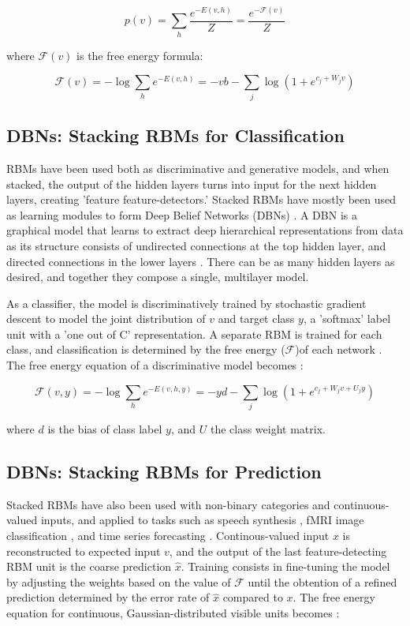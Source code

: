 \documentclass{report}
\begin{document}
\begin{equation}
p(v) =  \sum_h \frac{e^{-E(v,h)}}{Z} = \frac{e^{-\mathcal{F}(v)}}{Z}
\end{equation}

where $\mathcal{F}(v)$ is the free energy formula:

\begin{equation}
\mathcal{F}(v) = -\log \sum_h e^{-E(v,h)} = -vb - \sum_j \log (1 + e^{c_j + W_j v})
\label{eq:fev}
\end{equation}


\subsection{DBNs: Stacking RBMs for Classification}
RBMs have been used both as discriminative and generative models, and when stacked, the output of the hidden layers turns into input for the next hidden layers, creating 'feature feature-detectors.' Stacked RBMs have mostly been used as learning modules to form Deep Belief Networks (DBNs) \cite{Hinton} \cite{Schmah}. A DBN is a graphical model that learns to extract deep hierarchical representations from data as its structure consists of undirected connections at the top hidden layer, and directed connections in the lower layers \cite{Ngiam}. There can be as many hidden layers as desired, and together they compose a single, multilayer model.

As a classifier, the model is discriminatively trained by stochastic gradient descent to model the joint distribution of $v$ and target class $y$, a 'softmax' label unit with a 'one out of C' representation. A separate RBM is trained for each class, and classification is determined by the free energy ($\mathcal{F}$)of each network \cite{Elfwing}. The free energy equation of a discriminative model becomes \cite{Louradour}:

\begin{equation}
\mathcal{F}(v, y) = -\log \sum_h e^{-E(v,h,y)} = -yd - \sum_j \log (1 + e^{c_j + W_j v + U_j y})
\label{eq:fevy}
\end{equation}

where $d$ is the bias of class label $y$, and $U$ the class weight matrix. 


\subsection{DBNs: Stacking RBMs for Prediction}
Stacked RBMs have also been used with non-binary categories and continuous-valued inputs, and applied to tasks such as speech synthesis \cite{Jaitly}, fMRI image classification \cite{Schmah}, and time series forecasting \cite{Ginzburg} \cite{Kuremoto}. Continous-valued input $x$ is reconstructed to expected input $v$, and the output of the last feature-detecting RBM unit is the coarse prediction $\hat{x}$. Training consists in fine-tuning the model by adjusting the weights based on the value of $\mathcal{F}$ until the obtention of a refined prediction determined by the error rate of $\hat{x}$ compared to $x$\cite{Kuremoto}. The free energy equation for continuous, Gaussian-distributed visible units becomes \cite{Schmah}:
\end{document}
